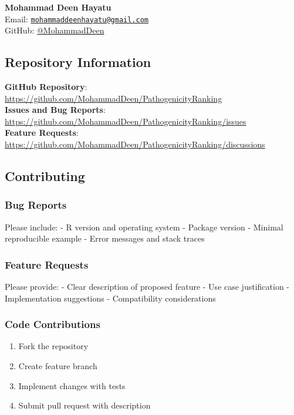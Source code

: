\documentclass[
  11pt,
]{article}
\providecommand{\tightlist}{%
  \setlength{\itemsep}{0pt}\setlength{\parskip}{0pt}}
\begin{document}
\textbf{Mohammad Deen Hayatu}\\
Email:
\href{mailto:mohammaddeenhayatu@gmail.com}{\nolinkurl{mohammaddeenhayatu@gmail.com}}\\
GitHub: \href{https://github.com/MohammadDeen}{@MohammadDeen}

\subsection{Repository Information}\label{repository-information}

\textbf{GitHub Repository}:
\url{https://github.com/MohammadDeen/PathogenicityRanking}\\
\textbf{Issues and Bug Reports}:
\url{https://github.com/MohammadDeen/PathogenicityRanking/issues}\\
\textbf{Feature Requests}:
\url{https://github.com/MohammadDeen/PathogenicityRanking/discussions}

\subsection{Contributing}\label{contributing}

\subsubsection{Bug Reports}\label{bug-reports}

Please include: - R version and operating system - Package version -
Minimal reproducible example - Error messages and stack traces

\subsubsection{Feature Requests}\label{feature-requests}

Please provide: - Clear description of proposed feature - Use case
justification - Implementation suggestions - Compatibility
considerations

\subsubsection{Code Contributions}\label{code-contributions}

\begin{enumerate}
\def\labelenumi{\arabic{enumi}.}
\tightlist
\item
  Fork the repository
\item
  Create feature branch
\item
  Implement changes with tests
\item
  Submit pull request with description
\end{enumerate}
\end{document}
